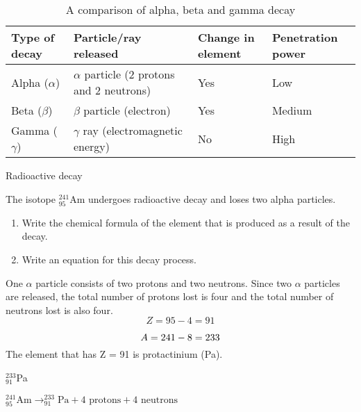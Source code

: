 \begin{table}[H]
\begin{center}
\caption{A comparison of alpha, beta and gamma decay}
\label{tab:radiation type summary}
\begin{tabular}{|l|l|p{2cm}|p{2cm}|}\hline
\textbf{Type of decay} & \textbf{Particle/ray released} & \textbf{Change in element} & \textbf{Penetration power} \\\hline
Alpha ($\alpha$) & $\alpha$ particle (2 protons and 2 neutrons) & Yes & Low \\\hline
Beta ($\beta$) & $\beta$ particle (electron)  &  Yes & Medium \\\hline
Gamma ($\gamma$) & $\gamma$ ray (electromagnetic energy) & No & High \\\hline
\end{tabular}
\end{center}
\end{table}
\begin{wex}{Radioactive decay}{The isotope $^{241}_{95}$Am undergoes radioactive decay and loses two alpha particles.
\begin{enumerate}
\item{Write the chemical formula of the element that is produced as a result of the decay.}
\item{Write an equation for this decay process.}
\end{enumerate}
}{
One $\alpha$ particle consists of two protons and two neutrons. Since two $\alpha$ particles are released, the total number of protons lost is four and the total number of neutrons lost is also four.
\begin{equation*}
Z = 95 - 4
= 91
\end{equation*}

\begin{equation*}
A = 241 - 8
= 233\\
\end{equation*}
The element that has Z = 91 is protactinium (Pa).
\begin{center}
$^{233}_{91}$Pa 
\end{center}
\begin{center}
$^{241}_{95}\text{Am} \rightarrow ^{233}_{91}\text{Pa} + 4 \text{ protons} + 4 \text{ neutrons}$
\end{center}
}
\end{wex}


